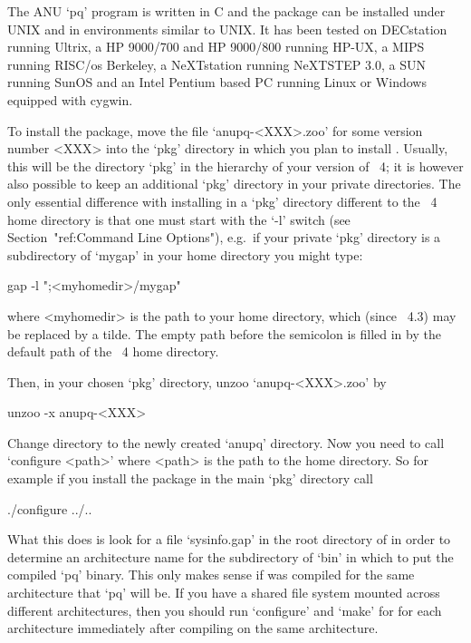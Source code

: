 

The ANU  `pq' program is  written in C  and the package can  be installed
under UNIX  and in environments  similar to UNIX.  It has been  tested on
DECstation running Ultrix, a HP 9000/700 and HP 9000/800 running HP-UX, a
MIPS running RISC/os Berkeley, a  NeXTstation running NeXTSTEP 3.0, a SUN
running  SunOS and an  Intel Pentium  based PC  running Linux  or Windows
equipped with cygwin.

To install the {\ANUPQ} package, move the file `anupq-<XXX>.zoo' for some
version number <XXX> into the  `pkg'  directory  in  which  you  plan  to
install {\ANUPQ}. Usually, this  will  be  the  directory  `pkg'  in  the
hierarchy of your version of {\GAP}~4; it is  however  also  possible  to
keep an additional `pkg' directory in your private directories. The  only
essential difference  with  installing  {\ANUPQ}  in  a  `pkg'  directory
different to the {\GAP}~4 home directory is that one  must  start  {\GAP}
with the `-l' switch (see Section~"ref:Command  Line  Options"),  e.g.~if
your private `pkg' directory is a subdirectory of `mygap'  in  your  home
directory you might type:

gap -l ";<myhomedir>/mygap"

where <myhomedir> is the  path  to  your  home  directory,  which  (since
{\GAP}~4.3) may be replaced  by  a  tilde.  The  empty  path  before  the
semicolon is  filled  in  by  the  default  path  of  the  {\GAP}~4  home
directory.

Then, in your chosen `pkg' directory, unzoo `anupq-<XXX>.zoo' by

{}unzoo -x anupq-<XXX>

Change directory to the newly created `anupq' directory. Now you need  to
call `configure <path>' where <path> is  the  path  to  the  {\GAP}  home
directory. So for example if you install the package in  the  main  `pkg'
directory call

\begintt
./configure ../..
\endtt

What this does is look for a file `sysinfo.gap' in the root directory  of
{\GAP} in order to determine an architecture name for the subdirectory of
`bin' in which to put the compiled `pq' binary. This only makes sense  if
{\GAP} was compiled for the same architecture that `pq' will be.  If  you
have a shared file system mounted across  different  architectures,  then
you should run `configure' and `make' for {\ANUPQ} for each  architecture
immediately after compiling {\GAP} on the same architecture.

